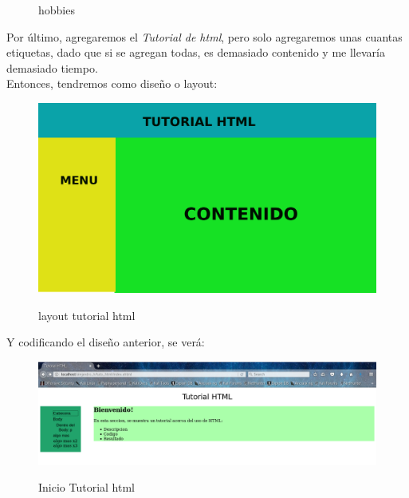 \documentclass[12pt,letterpaper, spanish]{article}
\begin{document}
\begin{flushleft}
\begin{center}
\begin{figure}[h!]
\vspace{-10mm}
{\em{\caption {hobbies}}}\label{figura 6}
\end{figure}
\end{center}
\vspace{-1cm}

Por \'ultimo, agregaremos el {\em Tutorial de html}, pero solo agregaremos unas cuantas etiquetas, dado que si se agregan todas, es demasiado contenido y me llevar\'ia demasiado tiempo.\\
Entonces, tendremos como dise\~no o layout:
\vspace{-5mm}
\begin{center}
\begin{figure}[h!]
\hspace{2cm}
\includegraphics[scale=0.2]{./imgs/tutohtml.png}
\vspace{-5mm}
{\em{\caption {layout tutorial html}}}\label{figura 7}
\end{figure}
\end{center}
\vspace{-1cm}
\newpage
Y codificando el dise\~no anterior, se ver\'a:
\vspace{-5mm}
\begin{center}
\begin{figure}[h!]
\includegraphics[scale=0.3]{./imgs/tuto.png}
\vspace{-10mm}
{\em{\caption {Inicio Tutorial html}}}\label{figura 8}

\end{figure}
\end{center}
\end{flushleft}
\end{document}
